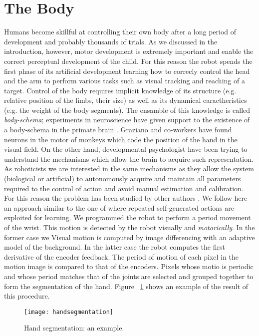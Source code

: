 \section{The Body}
Humans become skillful at controlling their own body after a long period of development and probably thousands of trials. As we discussed in the introduction, however, motor development is extremely important and enable the correct perceptual development of the child. For this reason the robot spends the first phase of its artificial development learning how to correcly control the head and the arm to perform various tasks such as visual tracking and reaching of a target.
Control of the body requires implicit knowledge of its structure (e.g. relative position of the limbs, their size) as well as its dynamical caractheristics (e.g. the weight of the body segments). The ensamble of this knowledge is called \emph{body-schema}; experiments in neuroscience have given support to the existence of a body-schema in the primate brain \cite{graziano99whereis,graziano00coding}. Graziano and co-workers have found neurons in the motor of monkeys which code the position of the hand in the visual field.
On the other hand, developmental psychologist have been trying to understand the mechanisms which allow the brain to acquire such representation. As roboticists we are interested in the same mechanisms as they allow the system (biological or artificial) to autonomously acquire and maintain all parameters required to the control of action and avoid manual estimation and calibration. For this reason the problem has been studied by other authors \cite{yoshikawa03doestheinvariance,fitzpatrick04feelthebeat,metta03early}.
We follow here an approach similar to the one of \cite{fitzpatrick04feelthebeat,metta03early} where repeated self-generated actions are exploited for learning. We programmed the robot to perform a period movement of the wrist. This motion is detected by the robot visually and \emph{motorically}. In the former case we Visual motion is computed by image differencing with an adaptive model of the background. In the latter case the robot computes the first derivative of the encoder feedback. The period of motion of each pixel in the motion image is compared to that of the encoders. Pixels whose motio is periodic and whose period matches that of the joints are selected and grouped together to form the segmentation of the hand. Figure ~\ref{fig-handsegmentation} shows an example of the result of this procedure.

\begin{figure}
\centering
\texttt{[image: handsegmentation]}
\caption{Hand segmentation: an example.}
\label{fig-handsegmentation}
\end{figure}

